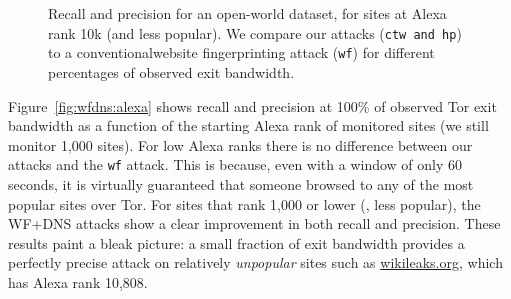 \begin{figure}[t]
\centering
{}
\caption{Recall and precision for an open-world dataset, for sites
at Alexa rank 10k (and less popular). We compare our attacks (\texttt{ctw and
 \texttt{hp}}) to a conventionalwebsite fingerprinting attack (\texttt{wf}) for different
 percentages of observed exit bandwidth. }
\label{fig:wfdns:torpct}
\end{figure}


Figure~\ref{fig:wfdns:alexa} shows recall and precision at 100\% of
observed Tor exit bandwidth as a function of the starting Alexa rank of
monitored sites (we still monitor 1,000 sites).
For low Alexa ranks there is no difference between our attacks and the
\texttt{wf} attack. This is because, even with a window of only 60 seconds,
it is virtually guaranteed that someone browsed to any of the most popular
sites over Tor. For sites that rank 1,000 or lower (\ie, less popular),
the WF+DNS attacks show a clear improvement in both recall and precision.
These results paint a bleak picture: a small fraction of exit
bandwidth provides a perfectly precise attack on relatively
\emph{unpopular} sites such as \url{wikileaks.org}, which has Alexa rank
10,808. 


